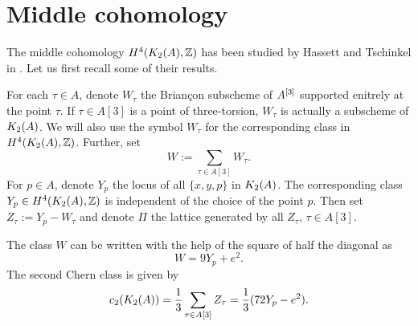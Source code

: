 \section{Middle cohomology}
The middle cohomology $H^4(K_{ 2 }( A ),\mathbb{Z})$ has been studied by Hassett and Tschinkel in \cite{Hassett}. Let us first recall some of their results.
\begin{notation}
For each $\tau \in A$, denote $W_\tau$ the Brian\c con subscheme of $A^{[3]}$ supported enitrely at the point $\tau$. If $\tau\in A[3]$ is a point of three-torsion, $W_\tau$ is actually a subscheme of $K_{ 2 }( A )$. We will also use the symbol $W_\tau$ for the corresponding class in $H^4(K_{ 2 }( A ),\mathbb{Z})$. Further, set 
$$
W := \sum_{\tau\in A[3]} W_\tau.
$$
For $p\in A$, denote $Y_p$ the locus of all $\{x,y,p\}$ in $K_{ 2 }( A )$. The corresponding class $Y_p \in H^4(K_{ 2 }( A ),\mathbb{Z})$ is independent of the choice of the point $p$. Then set $Z_\tau := Y_p - W_\tau$ and denote $\Pi$ the lattice generated by all $Z_\tau$, $\tau \in A[3]$.
\end{notation}
\begin{proposition}
The class $W$ can be written with the help of the square of half the diagonal as
$$
W= 9 Y_p + e^2.
$$
The second Chern class is given by 
$$
c_2(K_{ 2 }( A )) = \frac{1}{3}\sum_{\tau\in A[3] } Z_\tau  = \frac{1}{3}(72Y_p-e^2).
$$
\end{proposition}

